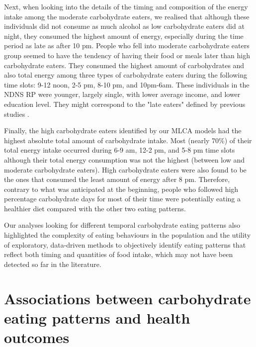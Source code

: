 Next, when looking into the details of the timing and composition of the energy intake among the moderate carbohydrate eaters, we realised that although these individuals did not consume as much alcohol as low carbohydrate eaters did at night, they consumed the highest amount of energy, especially during the time period as late as after 10 pm. People who fell into moderate carbohydrate eaters group seemed to have the tendency of having their food or meals later than high carbohydrate eaters. They consumed the highest amount of carbohydrates and also total energy among three types of carbohydrate eaters during the following time slots: 9-12 noon, 2-5 pm, 8-10 pm, and 10pm-6am. These individuals in the NDNS RP were younger, largely single, with lower average income, and lower education level. They might correspond to the "late eaters" defined by previous studies \parencite{leech2017temporal, mansukhani2018investigating}. 

Finally, the high carbohydrate eaters identified by our MLCA models had the highest absolute total amount of carbohydrate intake. Most (nearly 70\%) of their total energy intake occurred during 6-9 am, 12-2 pm, and 5-8 pm time slots although their total energy consumption was not the highest (between low and moderate carbohydrate eaters). High carbohydrate eaters were also found to be the ones that consumed the least amount of energy after 8 pm. Therefore, contrary to what was anticipated at the beginning, people who followed high percentage carbohydrate days for most of their time were potentially eating a healthier diet compared with the other two eating patterns. 

Our analyses looking for different temporal carbohydrate eating patterns also highlighted the complexity of eating behaviours in the population and the utility of exploratory, data-driven methods to objectively identify eating patterns that reflect both timing and quantities of food intake, which may not have been detected so far in the literature.


\section{Associations between carbohydrate eating patterns and health outcomes}

